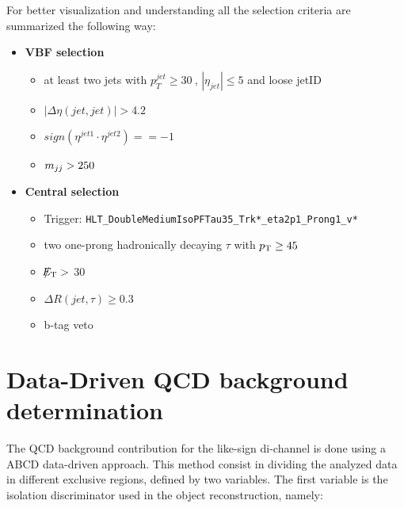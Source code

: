 For better visualization and understanding all the selection criteria are summarized the following way:


\begin{itemize}
	\item \textbf{VBF selection}
	\begin{itemize}
		\item at least two jets with $p_{T}^{jet}\geq30~$\gev, $|\eta_{jet}|\leq5$ and loose jetID
		\item $|\Delta\eta(jet,jet)| > 4.2$
		\item $sign(\eta^{jet 1}\cdot\eta^{jet 2})==-1$
		\item $m_{jj}>250~$\gev
	\end{itemize}
	\item \textbf{Central selection}
	\begin{itemize}
		\item Trigger: \texttt{HLT\_DoubleMediumIsoPFTau35\_Trk*\_eta2p1\_Prong1\_v*}
		\item two one-prong hadronically decaying $\tau$ with $p_{\text{T}}\geq45~$\gev 
		\item $\slash\mkern-12mu{E}_{\text{T}} > $ 30\gev
		\item $\Delta R(jet,\tau)\geq0.3$
		\item b-tag veto
	\end{itemize}
\end{itemize}


\clearpage



\section {Data-Driven QCD background determination} \label{sec:bgestimation}


The QCD background contribution for the like-sign di-\hadtau channel is done using a ABCD data-driven approach. This method consist in dividing the analyzed data in different exclusive regions, defined by two variables. The first variable is the \hadtau isolation discriminator used in the object reconstruction, namely:
 	
